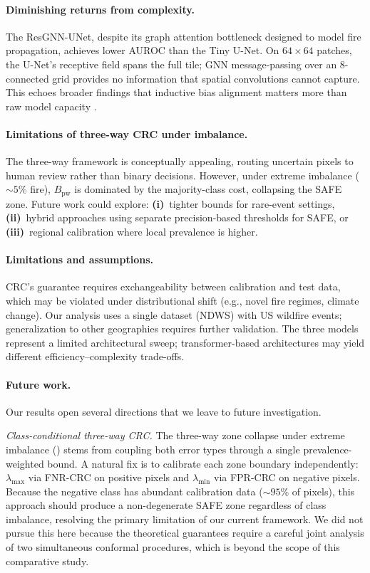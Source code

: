 \documentclass{article}
\begin{document}
\paragraph{Diminishing returns from complexity.}
The ResGNN-UNet, despite its graph attention bottleneck designed to model fire propagation, achieves lower AUROC than the Tiny U-Net.
On $64{\times}64$ patches, the U-Net's receptive field spans the full tile; GNN message-passing over an 8-connected grid provides no information that spatial convolutions cannot capture.
This echoes broader findings that inductive bias alignment matters more than raw model capacity \citep{ronneberger2015unet}.

\paragraph{Limitations of three-way CRC under imbalance.}
The three-way framework is conceptually appealing, routing uncertain pixels to human review rather than binary decisions.
However, under extreme imbalance (${\sim}5\%$ fire), $B_{\mathrm{pw}}$ is dominated by the majority-class cost, collapsing the SAFE zone.
Future work could explore: \textbf{(i)}~tighter bounds for rare-event settings, \textbf{(ii)}~hybrid approaches using separate precision-based thresholds for SAFE, or \textbf{(iii)}~regional calibration where local prevalence is higher.

\paragraph{Limitations and assumptions.}
CRC's guarantee requires exchangeability between calibration and test data, which may be violated under distributional shift (e.g., novel fire regimes, climate change).
Our analysis uses a single dataset (NDWS) with US wildfire events; generalization to other geographies requires further validation.
The three models represent a limited architectural sweep; transformer-based architectures may yield different efficiency--complexity trade-offs.

\paragraph{Future work.}
Our results open several directions that we leave to future investigation.

\textit{Class-conditional three-way CRC.}
The three-way zone collapse under extreme imbalance () stems from coupling both error types through a single prevalence-weighted bound.
A natural fix is to calibrate each zone boundary independently: $\lambda_{\max}$ via FNR-CRC on positive pixels and $\lambda_{\min}$ via FPR-CRC on negative pixels.
Because the negative class has abundant calibration data (${\sim}95\%$ of pixels), this approach should produce a non-degenerate SAFE zone regardless of class imbalance, resolving the primary limitation of our current framework.
We did not pursue this here because the theoretical guarantees require a careful joint analysis of two simultaneous conformal procedures, which is beyond the scope of this comparative study.
\end{document}
